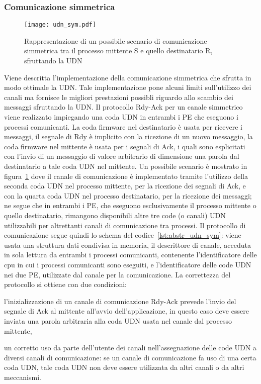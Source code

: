 \subsubsection{Comunicazione simmetrica}
\label{sct:sym_udn}
\begin{figure}[!b]
  \centering
  \texttt{[image: udn\_sym.pdf]}
  \caption[Comunicazione simmetrica su UDN]{Rappresentazione di un possibile scenario di comunicazione simmetrica tra il processo mittente S e quello destinatario R, sfruttando la UDN}
  \label{fig:udn_sym}
\end{figure}
Viene descritta l'implementazione della comunicazione simmetrica che sfrutta in modo ottimale la UDN. 
Tale implementazione pone alcuni limiti sull'utilizzo dei canali ma fornisce le migliori prestazioni possibli riguardo allo scambio dei messaggi sfruttando la UDN. Il protocollo Rdy-Ack per un canale simmetrico viene realizzato impiegando una coda UDN in entrambi i PE che eseguono i processi comunicanti. La coda firmware nel destinatario \`e usata per ricevere i messaggi, il segnale di Rdy \`e implicito con la ricezione di un nuovo messaggio, la coda firmware nel mittente \`e usata per i segnali di Ack, i quali sono esplicitati con l'invio di un messaggio di valore arbitrario di dimensione una parola dal destinatario a tale coda UDN nel mittente. Un possibile scenario \`e mostrato in figura~\ref{fig:udn_sym} dove il canale di comunicazione \`e implementato tramite l'utilizzo della seconda coda UDN nel processo mittente, per la ricezione dei segnali di Ack, e con la quarta coda UDN nel processo destinatario, per la ricezione dei messaggi; ne segue che in entrambi i PE, che eseguono esclusivamente il processo mittente o quello destinatario, rimangono disponibili altre tre code (o canali) UDN utilizzabili per altrettanti canali di comunicazione tra processi. Il protocollo di comunicazione segue quindi lo schema del codice~\ref{lst:abstr_udn_sym}: viene usata una struttura dati condivisa in memoria, il descrittore di canale, acceduta in sola lettura da entrambi i processi comunicanti, contenente l'identificatore delle cpu in cui i processi comunicanti sono eseguiti, e l'identificatore delle code UDN nei due PE, utilizzate dal canale per la comunicazione. La correttezza del protocollo si ottiene con due condizioni: \begin{inparaenum} \item l'inizializzazione di un canale di comunicazione Rdy-Ack prevede l'invio del segnale di Ack al mittente all'avvio dell'applicazione, in questo caso deve essere inviata una parola arbitraria alla coda UDN usata nel canale dal processo mittente, \item un corretto uso da parte dell'utente dei canali nell'assegnazione delle code UDN a diversi canali di comunicazione: se un canale di comunicazione fa uso di una certa coda UDN, tale coda UDN non deve essere utilizzata da altri canali o da altri meccanismi.\end{inparaenum}
